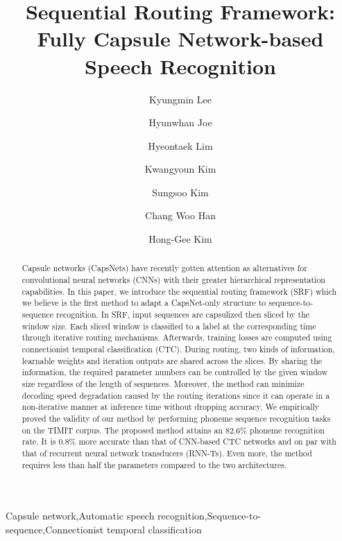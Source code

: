\documentclass[review]{elsarticle}
\begin{document}
\begin{frontmatter}

\title{Sequential Routing Framework: \\Fully Capsule Network-based Speech Recognition}

\author[address_snu,address_sec]{Kyungmin Lee}
\author[address_snu]{Hyunwhan Joe}
\author[address_sec]{Hyeontaek Lim}
\author[address_sec]{Kwangyoun Kim}
\author[address_sec]{Sungsoo Kim}
\author[address_sec]{Chang Woo Han}
\author[address_snu]{Hong-Gee Kim}

\address[address_snu]{Biomedical Knowledge Engineering Laboratory, Seoul National University, Seoul, 08826, Republic of Korea}
\address[address_sec]{Samsung Research, 56, Seongchon-gil, Seocho-gu, Seoul, 06765, Republic of Korea}

\begin{abstract}
Capsule networks (CapsNets) have recently gotten attention as alternatives for convolutional neural networks (CNNs) with their greater hierarchical representation capabilities.
In this paper, we introduce the sequential routing framework (SRF) which we believe is the first method to adapt a CapsNet-only structure to sequence-to-sequence recognition.
In SRF, input sequences are capsulized then sliced by the window size.
Each sliced window is classified to a label at the corresponding time through iterative routing mechanisms.
Afterwards, training losses are computed using connectionist temporal classification (CTC).
During routing, two kinds of information, learnable weights and iteration outputs are shared across the slices.
By sharing the information, the required parameter numbers can be controlled by the given window size regardless of the length of sequences.
Moreover, the method can minimize decoding speed degradation caused by the routing iterations since it can operate in a non-iterative manner at inference time without dropping accuracy.
We empirically proved the validity of our method by performing phoneme sequence recognition tasks on the TIMIT corpus.
The proposed method attains an 82.6\% phoneme recognition rate.
It is 0.8\% more accurate than that of CNN-based CTC networks and on par with that of recurrent neural network transducers (RNN-Ts).
Even more, the method requires less than half the parameters compared to the two architectures.
\end{abstract}

\begin{keyword}
Capsule network\sep Automatic speech recognition\sep Sequence-to-sequence\sep Connectionist temporal classification
\end{keyword}

\end{frontmatter}
\end{document}
